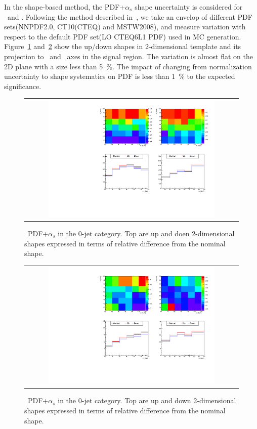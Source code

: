 In the shape-based method, the PDF+$\alpha_s$ shape uncertainty 
is considered for \qqww\ and \ggww.  
Following the method described in~\cite{pdfAN}, we take an envelop of different PDF 
sets(NNPDF2.0, CT10(CTEQ) and MSTW2008), and measure variation with respect to the default 
PDF set(LO CTEQ6L1 PDF) used in MC generation. 
Figure~\ref{fig:alter_pdfqqww} and~\ref{fig:alter_pdfggww} show the up/down 
shapes in 2-dimensional template and its projection to \mT\ and \mll\ axes
in the signal region. 
The variation is almost flat on the 2D plane with a size less than 5~\%. 
The impact of changing from normalization uncertainty to shape systematics on PDF 
is less than 1~\% to the expected significance.
%
\begin{figure}[htp] 
\centering 
\begin{tabular}{c} 
\includegraphics[width=0.8\textwidth]{figures/histo_qqWW_CMS_hww_PDFqqWW_0j_zoom.pdf} 
\end{tabular} 
\caption{ \qqww\ PDF+$\alpha_s$ in the 0-jet category. 
         Top are up and doen 2-dimensional shapes expressed in terms of relative 
         difference from the nominal shape.}
\label{fig:alter_pdfqqww} 
\end{figure} 
%
\begin{figure}[htp] 
\centering 
\begin{tabular}{c} 
\includegraphics[width=0.8\textwidth]{figures/histo_ggWW_CMS_hww_PDFggWW_0j_zoom.pdf} 
\end{tabular} 
\caption{ \ggww\ PDF+$\alpha_s$ in the 0-jet category.
         Top are up and down 2-dimensional shapes expressed in terms of relative 
         difference from the nominal shape.}
\label{fig:alter_pdfggww} 
\end{figure} 

